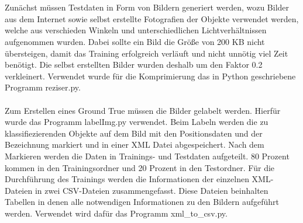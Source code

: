 \documentclass[a4paper,12pt,oneside]{article}
\begin{document}
\\\\
Zunächst müssen Testdaten in Form von Bildern generiert werden, wozu Bilder aus dem Internet sowie selbst erstellte Fotografien der Objekte verwendet werden, welche aus verschieden Winkeln und unterschiedlichen Lichtverhältnissen aufgenommen wurden. Dabei sollte ein Bild die Größe von 200 KB nicht übersteigen, damit das Training erfolgreich verläuft und nicht unnötig viel Zeit benötigt. Die selbst erstellten Bilder wurden deshalb um den Faktor 0.2 verkleinert. Verwendet wurde für die Komprimierung das in Python geschriebene Programm reziser.py.\\
\\
Zum Erstellen eines Ground True müssen die Bilder gelabelt werden. Hierfür wurde das Programm labelImg.py verwendet. Beim Labeln werden die zu klassifiezierenden Objekte auf dem Bild mit den Positionsdaten und der Bezeichnung markiert und in einer XML Datei abgespeichert. Nach dem Markieren werden die Daten in Trainings- und Testdaten aufgeteilt. 80 Prozent kommen in den Trainingsordner und 20 Prozent in den Testordner. Für die Durchführung des Trainings werden die Informationen der einzelnen XML-Dateien in zwei CSV-Dateien zusammengefasst. Diese Dateien beinhalten Tabellen in denen alle notwendigen Informationen zu den Bildern aufgeführt werden. Verwendet wird dafür das Programm xml\_to\_csv.py.
 
\end{document}
